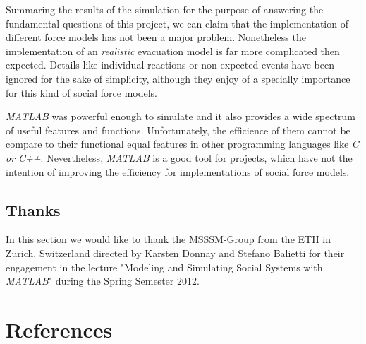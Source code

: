 \documentclass[11pt]{article}
\begin{document}
Summaring the results of the simulation for the purpose of answering the fundamental questions 
of this project, we can claim that the implementation of different force models
has not  been a major problem. Nonetheless the implementation
of an \textit{realistic} evacuation model is far more complicated then expected.
Details like individual-reactions or non-expected events have been 
ignored for the sake of simplicity, although they enjoy of a specially importance
for this kind of social force models.

\textit{MATLAB} was powerful enough to simulate and it also provides a wide spectrum of useful features and functions.
Unfortunately, the efficience of them cannot be compare to their functional equal features in 
other programming languages like \textit{C or C++}. Nevertheless, \textit{MATLAB} is a good tool
for projects, which have not the intention of improving the efficiency for implementations of social force models.

\subsection{Thanks}

In this section we would like to thank the MSSSM-Group from the ETH in Zurich, Switzerland
directed by Karsten Donnay and Stefano Balietti for their engagement in the lecture
"Modeling and Simulating Social Systems with \textit{MATLAB}" during the Spring Semester 2012.

\section{References}
\end{document}

